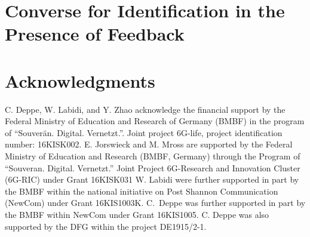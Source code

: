 \documentclass[runningheads]{llncs}
\begin{document}
\section{Converse for Identification in the Presence of Feedback}

\newpage


\section*{Acknowledgments}
C. Deppe, W. Labidi, and Y. Zhao acknowledge the financial support by the Federal Ministry of Education and Research
of Germany (BMBF) in the program of “Souverän. Digital. Vernetzt.”. Joint project 6G-life, project identification number: 16KISK002.
E. Jorswieck and M. Mross are supported by
the Federal Ministry of Education and Research (BMBF, Germany) through
the Program of “Souveran. Digital. Vernetzt.” Joint Project 6G-Research and
Innovation Cluster (6G-RIC) under Grant 16KISK031
W. Labidi were further supported in part by the BMBF within the national initiative on Post Shannon Communication (NewCom) under Grant 16KIS1003K. C.\ Deppe was further supported in part by the BMBF within NewCom under Grant 16KIS1005. C. Deppe was also supported by the DFG within the project DE1915/2-1. 


 
\end{document}
